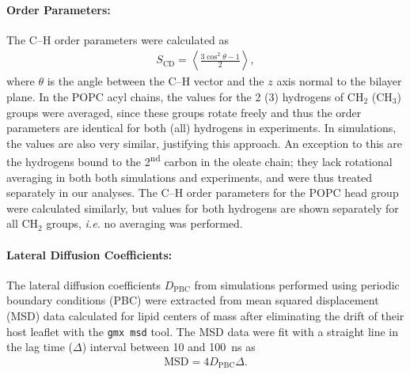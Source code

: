 \documentclass[aps,prl,superscriptaddress]{revtex4-2}
\begin{document}
\paragraph{Order Parameters:} The C--H order parameters were calculated as
%
\begin{align}
    S_\mathrm{CD}=\left\langle\frac{3\cos^2\theta-1}{2}\right\rangle,
\end{align}
%
where $\theta$ is the angle between the C--H vector and the $z$ axis normal to the bilayer plane. In the POPC acyl chains, the values for the 2 (3) hydrogens of CH$_2$ (CH$_3$) groups were averaged, since these groups rotate freely and thus the order parameters are identical for both (all) hydrogens in experiments. In simulations, the values are also very similar, justifying this approach. An exception to this are the hydrogens bound to the 2\textsuperscript{nd} carbon in the oleate chain; they lack rotational averaging in both both simulations and experiments, and were thus treated separately in our analyses. The C--H order parameters for the POPC head group were calculated similarly, but values for both hydrogens are shown separately for all CH$_2$ groups, \textit{i.e.} no averaging was performed. 

\paragraph{Lateral Diffusion Coefficients:} The lateral diffusion coefficients $D_\mathrm{PBC}$ from simulations performed using periodic boundary conditions (PBC) were extracted from mean squared displacement (MSD) data calculated for lipid centers of mass after eliminating the drift of their host leaflet with the \texttt{gmx msd} tool. The MSD data were fit with a straight line in the lag time ($\Delta$) interval between 10 and 100~ns as
%
\begin{align}
	\mathrm{MSD}=4D_\mathrm{PBC}\Delta.
\end{align}
\end{document}
